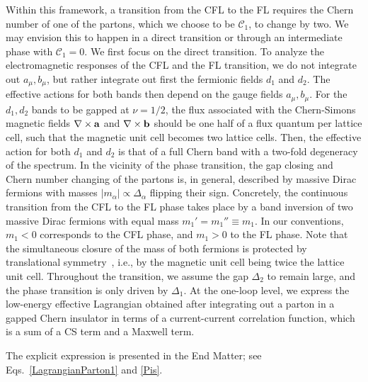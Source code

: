 \documentclass[aps,prl,twocolumn,superscriptaddress,floatfix, 10pt,longbibliography, nofootinbib]{revtex4-2}
\begin{document}
Within this framework, a transition from the CFL to the FL requires the Chern number of one of the partons, which we choose to be $\mathcal{C}_1$, to change by two. We may envision this to happen in a direct transition or through an intermediate phase with $\mathcal{C}_1=0$. We first focus on the direct transition.
To analyze the electromagnetic responses of the CFL and the FL transition, we do not integrate out $a_\mu,b_\mu$, but rather integrate out first the fermionic fields $d_1$ and $d_2$. The effective actions for both bands then depend on the gauge fields $a_\mu,b_\mu$. For the $d_1,d_2$ bands to be gapped at $\nu=1/2$, the flux associated with the Chern-Simons magnetic fields ${\bf \nabla}\times {\bf a}$ and ${\bf \nabla}\times{\bf b}$ should be one half of a flux quantum per lattice cell, such that the magnetic unit cell becomes two lattice cells. Then, the effective action for both $d_1$ and $d_2$ is that of a full Chern band with a two-fold degeneracy of the spectrum.
In the vicinity of the phase transition, the gap closing and Chern number changing of the partons is, in general, described by massive Dirac fermions with masses $|m_\alpha| \propto \Delta_\alpha$ flipping their sign.
Concretely, the continuous transition from the CFL to the FL phase takes place by a band inversion of two massive Dirac fermions with equal mass $m_1'=m_1''\equiv m_1$. In our conventions, $m_1 < 0$ corresponds to the CFL phase, and $m_1 >0$ to the FL phase. Note that the simultaneous closure of the mass of both fermions is protected by translational symmetry~\cite{song_phase_2024}, i.e., by the magnetic unit cell being twice the lattice unit cell.
Throughout the transition, we assume the gap $\Delta_2$ to remain large, and the phase transition is only driven by $\Delta_1$.
At the one-loop level, we express the low-energy effective Lagrangian obtained after integrating out a parton in a gapped Chern insulator in terms of a current-current correlation function, which is a sum of a CS term and a Maxwell term.

The explicit expression is presented in the End Matter; see Eqs.~\eqref{LagrangianParton1} and \eqref{Pis}.
\end{document}
